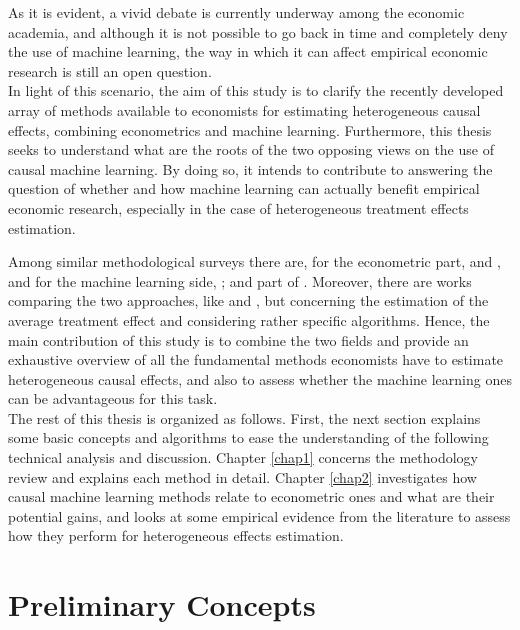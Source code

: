 \documentclass[12pt,a4paper,openright,twoside]{book}
\begin{document}
\begin{doublespacing}
As it is evident, a vivid debate is currently underway among the economic academia, and although it is not possible to go back in time and completely deny the use of machine learning, the way in which it can affect empirical economic research is still an open question. \\

In light of this scenario, the aim of this study is to clarify the recently developed array of methods available to economists for estimating heterogeneous causal effects, combining econometrics and machine learning. 
Furthermore, this thesis seeks to understand what are the roots of the two opposing views on the use of causal machine learning. By doing so, it intends to contribute to answering the question of whether and how machine learning can actually benefit empirical economic research, especially in the case of heterogeneous treatment effects estimation.

Among similar methodological surveys there are, for the econometric part, \citet{xie2012estimating} and \citet{zhouxie2020heterogeneous}, and for the machine learning side, \citet{gongetal}; \citet{Knaus_2020} and part of \cite{athey2019}. Moreover, there are works comparing the two approaches, like \citet{dorie2019automated} and \citet{heckmanpinto2022}, but concerning the estimation of the average treatment effect and considering rather specific algorithms. Hence, the main contribution of this study is to combine the two fields and provide an exhaustive overview of all the fundamental methods economists have to estimate heterogeneous causal effects, and also to assess whether the machine learning ones can be advantageous for this task. \\

The rest of this thesis is organized as follows. First, the next section explains some basic concepts and algorithms to ease the understanding of the following technical analysis and discussion. Chapter \ref{chap1} concerns the methodology review and explains each method in detail. Chapter \ref{chap2} investigates how causal machine learning methods relate to econometric ones and what are their potential gains, and looks at some empirical evidence from the literature to assess how they perform for heterogeneous effects estimation.



\section*{Preliminary Concepts} \label{prelconc}


\end{doublespacing}
\end{document}
